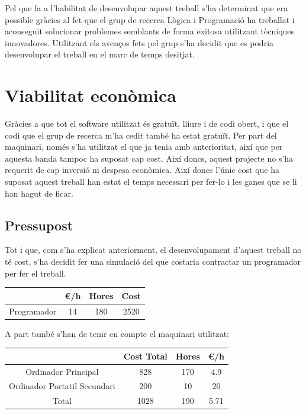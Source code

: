 \documentclass[11pt,a4paper,twoside]{report}
\begin{document}
  Pel que fa a l'habilitat de desenvolupar aquest treball s'ha determinat que era possible gràcies al fet que
  el grup de recerca Lògica i Programació ha treballat i aconseguit solucionar problemes semblants de forma exitosa utilitzant tècniques innovadores. 
  Utilitzant els avenços fets pel grup s'ha decidit que es podria desenvolupar el treball en el marc de temps desitjat.



  \section{Viabilitat econòmica}
  
  Gràcies a que tot el software utilitzat és gratuït, lliure i de codi obert, i que el codi que el grup de recerca m'ha cedit també ha estat gratuït. Per part del maquinari, només s'ha utilitzat el que ja tenia amb anterioritat, així que per aquesta banda tampoc ha suposat cap cost.
  Així doncs, aquest projecte no s'ha requerit de cap inversió ni despesa econòmica. 
  Així doncs l'únic cost que ha suposat aquest treball han estat el temps necessari per fer-lo i les ganes que se li han hagut de ficar. 


  \subsection{Pressupost}
  Tot i que, com s'ha explicat anteriorment, el desenvolupament d'aquest treball no té cost, s'ha decidit fer una simulació del que costaria contractar un programador per fer el treball.
  
  \begin{center}
    \begin{tabular}{|| c | c | c | c||} 
    \hline
     & \euro/h & Hores & Cost \\ [0.5ex] 
    \hline\hline
    Programador & 14 & 180 & 2520 \\ [1ex] 
    \hline
   \end{tabular}
   \end{center}

   A part també s'han de tenir en compte el maquinari utilitzat:
   \begin{center}
    \begin{tabular}{|| c | c | c | c||} 
    \hline
     & Cost Total & Hores & \euro/h \\ [0.5ex] 
    \hline\hline
    Ordinador Principal & 828 & 170 & 4.9 \\ [1ex] 
    Ordinador Portatil Secundari & 200 & 10 & 20 \\ [1ex] 
    \hline\hline
    Total & 1028 & 190 & 5.71 \\


    \hline
   \end{tabular}
   \end{center}
\end{document}
